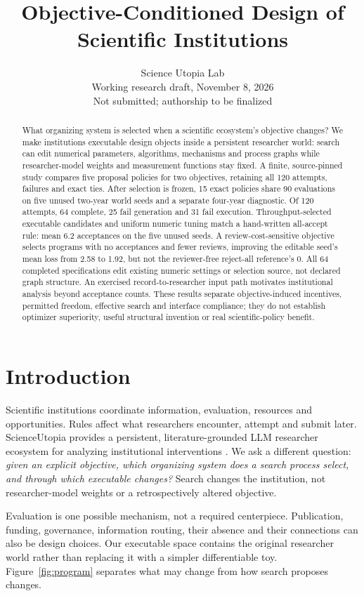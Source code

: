 \documentclass{article}
\title{Objective-Conditioned Design of Scientific Institutions}
\author{Science Utopia Lab\\Working research draft, November 8, 2026\\Not submitted; authorship to be finalized}
\begin{document}
\maketitle
\begin{abstract}
What organizing system is selected when a scientific ecosystem's objective
changes? We make institutions executable design objects inside a persistent
researcher world: search can edit numerical parameters, algorithms, mechanisms
and process graphs while researcher-model weights and measurement functions
stay fixed. A finite, source-pinned study compares five proposal policies for
two objectives, retaining all 120 attempts, failures and exact ties. After
selection is frozen, 15 exact policies share 90 evaluations on five unused
two-year world seeds and a separate four-year diagnostic. Of 120 attempts, 64
complete, 25 fail generation and 31 fail execution. Throughput-selected
executable candidates and uniform numeric tuning match a hand-written
all-accept rule: mean 6.2 acceptances on the five unused seeds. A review-cost-sensitive
objective selects programs with no acceptances and fewer reviews, improving
the editable seed's mean loss from 2.58 to 1.92, but not the reviewer-free
reject-all reference's 0. All 64 completed specifications edit existing numeric
settings or selection source, not declared graph structure. An exercised
record-to-researcher input path motivates institutional analysis beyond
acceptance counts. These results separate objective-induced incentives,
permitted freedom, effective search and interface compliance; they do not
establish optimizer superiority, useful structural invention or real
scientific-policy benefit.
\end{abstract}

\section{Introduction}
Scientific institutions coordinate information, evaluation, resources and
opportunities. Rules affect what researchers encounter, attempt and submit
later. ScienceUtopia provides a persistent, literature-grounded LLM researcher
ecosystem for analyzing institutional interventions \citep{jin2026scienceutopia}.
We ask a different question: \emph{given an explicit objective, which organizing
system does a search process select, and through which executable changes?}
Search changes the institution, not researcher-model weights or a retrospectively
altered objective.

Evaluation is one possible mechanism, not a required centerpiece. Publication,
funding, governance, information routing, their absence and their connections
can also be design choices. Our executable space contains the original
researcher world rather than replacing it with a simpler differentiable toy.
Figure~\ref{fig:program} separates what may change from how search proposes changes.
\end{document}
